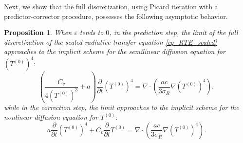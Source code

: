 \documentclass[preprint,12pt]{elsarticle}
\theoremstyle{definition}
\theoremstyle{plain}
\newtheorem{proposition}[theorem]{Proposition}
\numberwithin{equation}{section}
\numberwithin{algorithm}{section}
\newcounter{eq_count}
\newcommand{\pdrv}[2]{\frac{\partial{#1}}{\partial{#2}}}
\begin{document}
Next, we show that the full discretization, using Picard iteration with a predictor-corrector procedure, possesses the following asymptotic behavior.
\begin{proposition}
    When $\varepsilon$ tends to $0$, in  the prediction step, the limit of the  full discretization of the scaled radiative transfer equation \eqref{eq_RTE_scaled}  approaches to the implicit scheme for the semilinear diffusion equation for $(T^{(0)})^4:$
    \begin{equation} \label{eq_quasi}
    		( \frac{C_v}{4(T^{(0)})^3} + a) \pdrv{}{t} (T^{(0)})^4  = \nabla \cdot \left( \frac{ac}{3 \sigma_R} \nabla (T^{(0)})^4 \right), 
    \end{equation}
    while in  the correction step, the limit approaches to the implicit scheme for the nonlinear diffusion equation for $T^{(0)}:$
        \begin{equation} \label{eq_non}
       		a \pdrv{}{t} (T^{(0)})^4 + C_v \pdrv{}{t}T^{(0)} = \nabla \cdot \left( \frac{ac}{3 \sigma_R} \nabla (T^{(0)})^4\right).
    \end{equation}
\end{proposition}
\end{document}
